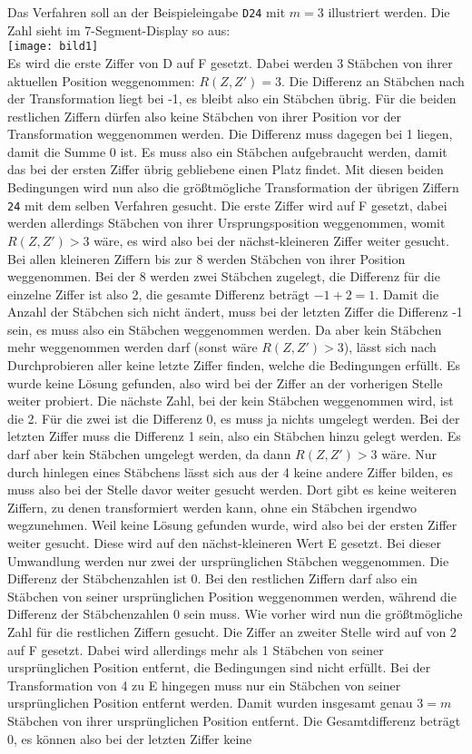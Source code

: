 \documentclass[a4paper,10pt,ngerman]{scrartcl}
\begin{document}
Das Verfahren soll an der Beispieleingabe \lstinline|D24| mit $m=3$ illustriert werden. Die Zahl sieht im 7-Segment-Display so aus: \\
\texttt{[image: bild1]}\\
Es wird die erste Ziffer von D auf F gesetzt. Dabei werden 3 Stäbchen von ihrer aktuellen Position weggenommen: $R(Z, Z')=3$. Die Differenz an Stäbchen nach der Transformation liegt bei -1, es bleibt also ein Stäbchen übrig. Für die beiden restlichen Ziffern dürfen also keine Stäbchen von ihrer Position vor der Transformation weggenommen werden. Die Differenz muss dagegen bei 1 liegen, damit die Summe $0$ ist. Es muss also ein Stäbchen aufgebraucht werden, damit das bei der ersten Ziffer übrig gebliebene einen Platz findet. Mit diesen beiden Bedingungen wird nun also die größtmögliche Transformation der übrigen Ziffern \lstinline|24| mit dem selben Verfahren gesucht. Die erste Ziffer wird auf F gesetzt, dabei werden allerdings Stäbchen von ihrer Ursprungsposition weggenommen, womit $R(Z, Z') > 3$ wäre, es wird also bei der nächst-kleineren Ziffer weiter gesucht. Bei allen kleineren Ziffern bis zur 8 werden Stäbchen von ihrer Position weggenommen. Bei der 8 werden zwei Stäbchen zugelegt, die Differenz für die einzelne Ziffer ist also 2, die gesamte Differenz beträgt $-1 + 2 = 1$. Damit die Anzahl der Stäbchen sich nicht ändert, muss bei der letzten Ziffer die Differenz -1 sein, es muss also ein Stäbchen weggenommen werden. Da aber kein Stäbchen mehr weggenommen werden darf (sonst wäre $R(Z, Z') > 3$), lässt sich nach Durchprobieren aller keine letzte Ziffer finden, welche die Bedingungen erfüllt. Es wurde keine Lösung gefunden, also wird bei der Ziffer an der vorherigen Stelle weiter probiert. Die nächste Zahl, bei der kein Stäbchen weggenommen wird, ist die 2. Für die zwei ist die Differenz 0, es muss ja nichts umgelegt werden. Bei der letzten Ziffer muss die Differenz 1 sein, also ein Stäbchen hinzu gelegt werden. Es darf aber kein Stäbchen umgelegt werden, da dann $R(Z, Z') > 3$ wäre. Nur durch hinlegen eines Stäbchens lässt sich aus der 4 keine andere Ziffer bilden, es muss also bei der Stelle davor weiter gesucht werden. Dort gibt es keine weiteren Ziffern, zu denen transformiert werden kann, ohne ein Stäbchen irgendwo wegzunehmen. Weil keine Lösung gefunden wurde, wird also bei der ersten Ziffer weiter gesucht. Diese wird auf den nächst-kleineren Wert E gesetzt. Bei dieser Umwandlung werden nur zwei der ursprünglichen Stäbchen weggenommen. Die Differenz der Stäbchenzahlen ist 0. Bei den restlichen Ziffern darf also ein Stäbchen von seiner ursprünglichen Position weggenommen werden, während die Differenz der Stäbchenzahlen 0 sein muss. Wie vorher wird nun die größtmögliche Zahl für die restlichen Ziffern gesucht. Die Ziffer an zweiter Stelle wird auf von 2 auf F gesetzt. Dabei wird allerdings mehr als 1 Stäbchen von seiner ursprünglichen Position entfernt, die Bedingungen sind nicht erfüllt. Bei der Transformation von 4 zu E hingegen muss nur ein Stäbchen von seiner ursprünglichen Position entfernt werden. Damit wurden insgesamt genau $3=m$ Stäbchen von ihrer ursprünglichen Position entfernt. Die Gesamtdifferenz beträgt 0, es können also bei der letzten Ziffer keine 
\end{document}
